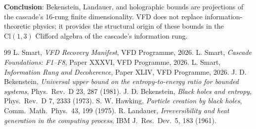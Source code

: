 \documentclass[12pt]{article}
\theoremstyle{remark}
\begin{document}
\textbf{Conclusion}: Bekenstein, Landauer, and holographic bounds are projections of the cascade's 16-rung finite dimensionality. VFD does not replace information-theoretic physics; it provides the structural origin of these bounds in the $\mathrm{Cl}(1,3)$ Clifford algebra of the cascade's information rung.


\begin{thebibliography}{99}
 L. Smart, \emph{VFD Recovery Manifest}, VFD Programme, 2026.
 L. Smart, \emph{Cascade Foundations: F1--F8}, Paper XXXVI, VFD Programme, 2026.
 L. Smart, \emph{Information Rung and Decoherence}, Paper XLIV, VFD Programme, 2026.
 J. D. Bekenstein, \emph{Universal upper bound on the entropy-to-energy ratio for bounded systems}, Phys.\ Rev.\ D 23, 287 (1981).
 J. D. Bekenstein, \emph{Black holes and entropy}, Phys.\ Rev.\ D 7, 2333 (1973).
 S. W. Hawking, \emph{Particle creation by black holes}, Comm.\ Math.\ Phys.\ 43, 199 (1975).
 R. Landauer, \emph{Irreversibility and heat generation in the computing process}, IBM J.\ Res.\ Dev.\ 5, 183 (1961).
\end{thebibliography}
\end{document}
